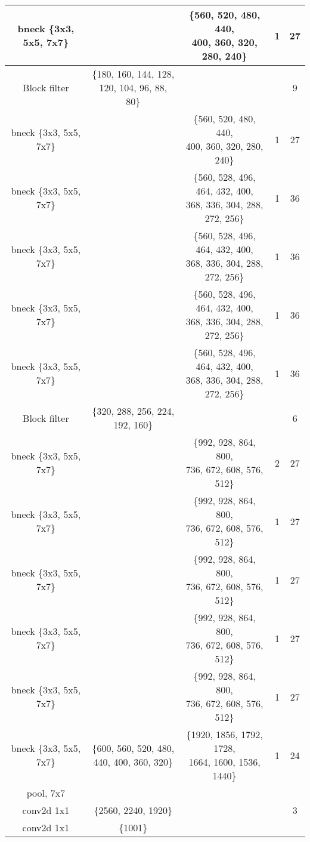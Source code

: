 \begin{table}
\begin{center}
\begin{tabular}[hp]{c|c|c|c|c}
  bneck \{3x3, 5x5, 7x7\} & &\shortstack{\{560, 520, 480, 440, \\ 400, 360, 320, 280, 240\}} &1 &27\\
\hline
Block filter &\shortstack{\{180, 160, 144, 128, \\ 120, 104, 96, 88, 80\}} & & &9\\
  bneck \{3x3, 5x5, 7x7\} & &\shortstack{\{560, 520, 480, 440, \\400, 360, 320, 280, 240\}} &1 &27\\
  bneck \{3x3, 5x5, 7x7\} & &\shortstack{\{560, 528, 496, 464, 432, 400, \\  368, 336, 304, 288, 272, 256\}} &1 &36 \\
  bneck \{3x3, 5x5, 7x7\} & &\shortstack{\{560, 528, 496, 464, 432, 400, \\ 368, 336, 304, 288, 272, 256\}} &1 &36 \\
  bneck \{3x3, 5x5, 7x7\} & &\shortstack{\{560, 528, 496, 464, 432, 400, \\ 368, 336, 304, 288, 272, 256\}} &1 &36 \\
  bneck \{3x3, 5x5, 7x7\} & &\shortstack{\{560, 528, 496, 464, 432, 400, \\ 368, 336, 304, 288, 272, 256\}} &1 &36 \\
\hline

Block filter &\{320, 288, 256, 224, 192, 160\} & & &6 \\
  bneck \{3x3, 5x5, 7x7\} & &\shortstack{\{992, 928, 864, 800, \\ 736, 672, 608, 576, 512\}} &2 &27 \\
  bneck \{3x3, 5x5, 7x7\} & &\shortstack{\{992, 928, 864, 800, \\ 736, 672, 608, 576, 512\}} &1 &27 \\
  bneck \{3x3, 5x5, 7x7\} & &\shortstack{\{992, 928, 864, 800,\\ 736, 672, 608, 576, 512\}} &1 &27 \\
  bneck \{3x3, 5x5, 7x7\} & &\shortstack{\{992, 928, 864, 800, \\736, 672, 608, 576, 512\}} &1 &27 \\
  bneck \{3x3, 5x5, 7x7\} & &\shortstack{\{992, 928, 864, 800,\\ 736, 672, 608, 576, 512\}} &1 &27 \\
\hline
  bneck \{3x3, 5x5, 7x7\} &\shortstack{\{600, 560, 520, 480,\\ 440, 400, 360, 320\}} &\shortstack{\{1920, 1856, 1792, 1728,\\ 1664, 1600, 1536, 1440\}} &1 &24 \\
\hline
  pool, 7x7  & & &\\
  conv2d 1x1  &\{2560, 2240, 1920\} & & &3\\
  conv2d 1x1 &\{1001\} & & \\
\hline
\hline

\end{tabular}
\end{center}
\end{table}


